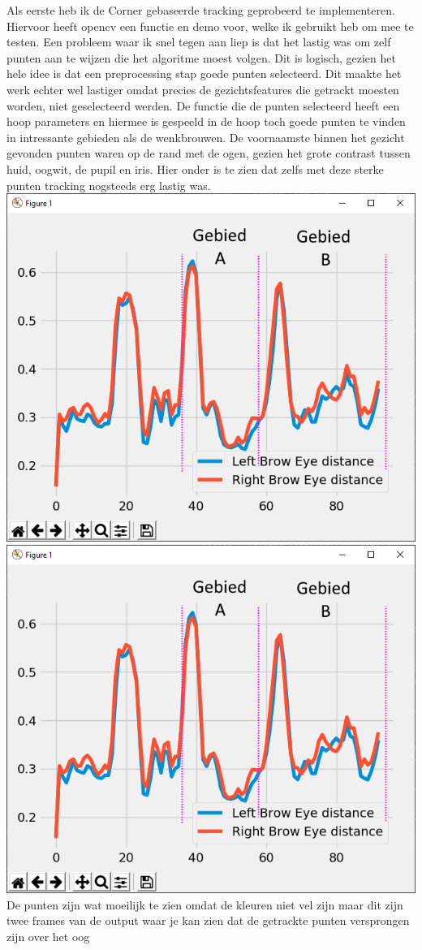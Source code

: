 \documentclass[11pt]{article}
\begin{document}
    Als eerste heb ik de Corner gebaseerde tracking geprobeerd te implementeren.
    Hiervoor heeft opencv een functie en demo voor, welke ik gebruikt heb om mee te testen.
    Een probleem waar ik snel tegen aan liep is dat het lastig was om zelf punten aan te wijzen die het algoritme moest volgen.
    Dit is logisch, gezien het hele idee is dat een preprocessing stap goede punten selecteerd. 
    Dit maakte het werk echter wel lastiger omdat precies de gezichtsfeatures die getrackt moesten worden, niet geselecteerd werden. 
    De functie die de punten selecteerd heeft een hoop parameters en hiermee is gespeeld in de hoop toch goede punten te vinden in intressante gebieden als de wenkbrouwen.
    De voornaamste binnen het gezicht gevonden punten waren op de rand met de ogen, gezien het grote contrast tussen huid, oogwit, de pupil en iris.
    Hier onder is te zien dat zelfs met deze sterke punten tracking nogsteeds erg lastig was. 
    \newline
    \includegraphics[width=0.6\linewidth]{Images/Probleem_landmark.png}
    \includegraphics[width=0.6\linewidth]{Images/Probleem_landmark.png}
    \newline
    De punten zijn wat moeilijk te zien omdat de kleuren niet vel zijn maar dit zijn twee frames van de output waar je kan zien dat de getrackte punten versprongen zijn over het oog
\end{document}

